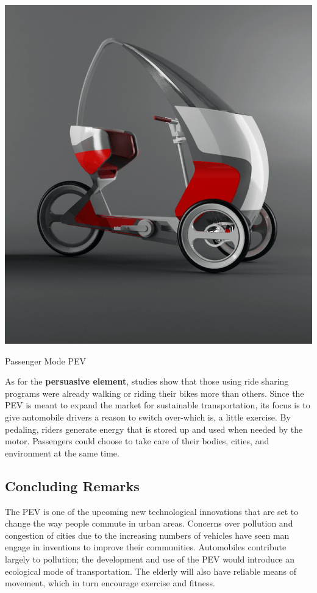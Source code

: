 \begin{marginfigure}
	\includegraphics[width=\linewidth]{figs/01/unfolded}
	\caption{Passenger Mode PEV}
\end{marginfigure}

As for the \textbf{persuasive element}, studies show that those using ride sharing programs were already walking or riding their bikes more than others. Since the PEV is meant to expand the market for sustainable transportation, its focus is to give automobile drivers a reason to switch over-which is, a little exercise. By pedaling, riders generate energy that is stored up and used when needed by the motor. Passengers could choose to take care of their bodies, cities, and environment at the same time.

\subsection{Concluding Remarks}

The PEV is one of the upcoming new technological innovations that are set to change the way people commute in urban areas. Concerns over pollution and congestion of cities due to the increasing numbers of vehicles have seen man engage in inventions to improve their communities. Automobiles contribute largely to pollution; the development and use of the PEV would introduce an ecological mode of transportation. The elderly will also have reliable means of movement, which in turn encourage exercise and fitness.

